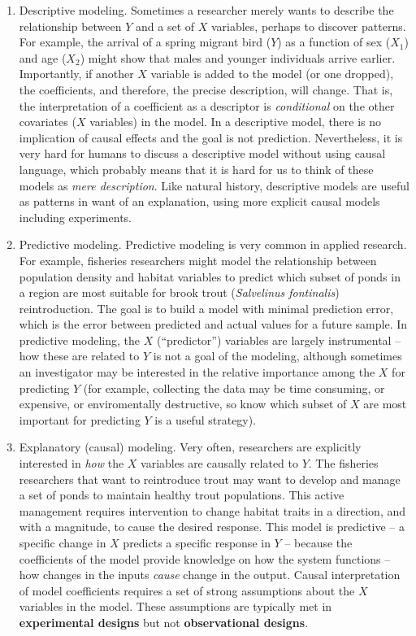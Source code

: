 \documentclass[]{book}
\begin{document}
\begin{enumerate}
\def\labelenumi{\arabic{enumi}.}
\item
  Descriptive modeling. Sometimes a researcher merely wants to describe the relationship between \(Y\) and a set of \(X\) variables, perhaps to discover patterns. For example, the arrival of a spring migrant bird (\(Y\)) as a function of sex (\(X_1\)) and age (\(X_2\)) might show that males and younger individuals arrive earlier. Importantly, if another \(X\) variable is added to the model (or one dropped), the coefficients, and therefore, the precise description, will change. That is, the interpretation of a coefficient as a descriptor is \emph{conditional} on the other covariates (\(X\) variables) in the model. In a descriptive model, there is no implication of causal effects and the goal is not prediction. Nevertheless, it is very hard for humans to discuss a descriptive model without using causal language, which probably means that it is hard for us to think of these models as \emph{mere description}. Like natural history, descriptive models are useful as patterns in want of an explanation, using more explicit causal models including experiments.
\item
  Predictive modeling. Predictive modeling is very common in applied research. For example, fisheries researchers might model the relationship between population density and habitat variables to predict which subset of ponds in a region are most suitable for brook trout (\emph{Salvelinus fontinalis}) reintroduction. The goal is to build a model with minimal prediction error, which is the error between predicted and actual values for a future sample. In predictive modeling, the \(X\) (``predictor'') variables are largely instrumental -- how these are related to \(Y\) is not a goal of the modeling, although sometimes an investigator may be interested in the relative importance among the \(X\) for predicting \(Y\) (for example, collecting the data may be time consuming, or expensive, or enviromentally destructive, so know which subset of \(X\) are most important for predicting \(Y\) is a useful strategy).
\item
  Explanatory (causal) modeling. Very often, researchers are explicitly interested in \emph{how} the \(X\) variables are causally related to \(Y\). The fisheries researchers that want to reintroduce trout may want to develop and manage a set of ponds to maintain healthy trout populations. This active management requires intervention to change habitat traits in a direction, and with a magnitude, to cause the desired response. This model is predictive -- a specific change in \(X\) predicts a specific response in \(Y\) -- because the coefficients of the model provide knowledge on how the system functions -- how changes in the inputs \emph{cause} change in the output. Causal interpretation of model coefficients requires a set of strong assumptions about the \(X\) variables in the model. These assumptions are typically met in \textbf{experimental designs} but not \textbf{observational designs}.
\end{enumerate}
\end{document}

